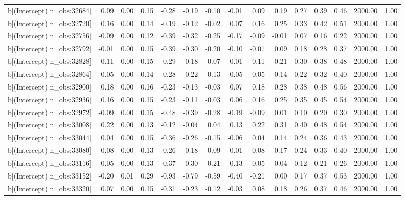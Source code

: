 \begin{table}[ht]
\begin{tabular}{rrrrrrrrrrrrrrr}
  b[(Intercept) n\_obs:32684] & 0.09 & 0.00 & 0.15 & -0.28 & -0.19 & -0.10 & -0.01 & 0.09 & 0.19 & 0.27 & 0.39 & 0.46 & 2000.00 & 1.00 \\ 
  b[(Intercept) n\_obs:32720] & 0.16 & 0.00 & 0.14 & -0.19 & -0.12 & -0.02 & 0.07 & 0.16 & 0.25 & 0.33 & 0.42 & 0.51 & 2000.00 & 1.00 \\ 
  b[(Intercept) n\_obs:32756] & -0.09 & 0.00 & 0.12 & -0.39 & -0.32 & -0.25 & -0.17 & -0.09 & -0.01 & 0.07 & 0.16 & 0.22 & 2000.00 & 1.00 \\ 
  b[(Intercept) n\_obs:32792] & -0.01 & 0.00 & 0.15 & -0.39 & -0.30 & -0.20 & -0.10 & -0.01 & 0.09 & 0.18 & 0.28 & 0.37 & 2000.00 & 1.00 \\ 
  b[(Intercept) n\_obs:32828] & 0.11 & 0.00 & 0.15 & -0.29 & -0.18 & -0.07 & 0.01 & 0.11 & 0.21 & 0.30 & 0.38 & 0.48 & 2000.00 & 1.00 \\ 
  b[(Intercept) n\_obs:32864] & 0.05 & 0.00 & 0.14 & -0.28 & -0.22 & -0.13 & -0.05 & 0.05 & 0.14 & 0.22 & 0.32 & 0.40 & 2000.00 & 1.00 \\ 
  b[(Intercept) n\_obs:32900] & 0.18 & 0.00 & 0.16 & -0.23 & -0.13 & -0.03 & 0.07 & 0.18 & 0.28 & 0.38 & 0.48 & 0.56 & 2000.00 & 1.00 \\ 
  b[(Intercept) n\_obs:32936] & 0.16 & 0.00 & 0.15 & -0.23 & -0.11 & -0.03 & 0.06 & 0.16 & 0.25 & 0.35 & 0.45 & 0.54 & 2000.00 & 1.00 \\ 
  b[(Intercept) n\_obs:32972] & -0.09 & 0.00 & 0.15 & -0.48 & -0.39 & -0.28 & -0.19 & -0.09 & 0.01 & 0.10 & 0.20 & 0.30 & 2000.00 & 1.00 \\ 
  b[(Intercept) n\_obs:33008] & 0.22 & 0.00 & 0.13 & -0.12 & -0.04 & 0.04 & 0.13 & 0.22 & 0.31 & 0.40 & 0.48 & 0.54 & 2000.00 & 1.00 \\ 
  b[(Intercept) n\_obs:33044] & 0.04 & 0.00 & 0.15 & -0.36 & -0.26 & -0.15 & -0.06 & 0.04 & 0.14 & 0.24 & 0.36 & 0.43 & 2000.00 & 1.00 \\ 
  b[(Intercept) n\_obs:33080] & 0.08 & 0.00 & 0.13 & -0.26 & -0.18 & -0.09 & -0.01 & 0.08 & 0.17 & 0.24 & 0.33 & 0.40 & 2000.00 & 1.00 \\ 
  b[(Intercept) n\_obs:33116] & -0.05 & 0.00 & 0.13 & -0.37 & -0.30 & -0.21 & -0.13 & -0.05 & 0.04 & 0.12 & 0.21 & 0.26 & 2000.00 & 1.00 \\ 
  b[(Intercept) n\_obs:33152] & -0.20 & 0.01 & 0.29 & -0.93 & -0.79 & -0.59 & -0.40 & -0.21 & 0.00 & 0.17 & 0.37 & 0.53 & 2000.00 & 1.00 \\ 
  b[(Intercept) n\_obs:33320] & 0.07 & 0.00 & 0.15 & -0.31 & -0.23 & -0.12 & -0.03 & 0.08 & 0.18 & 0.26 & 0.37 & 0.46 & 2000.00 & 1.00 \\ 

\end{tabular}
\end{table}
